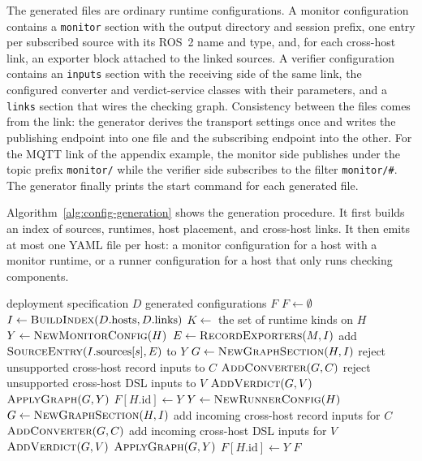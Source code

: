 The generated files are ordinary runtime configurations. A monitor
configuration contains a \texttt{monitor} section with the output directory
and session prefix, one entry per subscribed source with its ROS~2 name and
type, and, for each cross-host link, an exporter block attached to the linked
sources. A verifier configuration contains an \texttt{inputs} section with
the receiving side of the same link, the configured converter and
verdict-service classes with their parameters, and a \texttt{links} section
that wires the checking graph. Consistency between the files comes from the
link: the generator derives the transport settings once and writes the
publishing endpoint into one file and the subscribing endpoint into the
other. For the MQTT link of the appendix example, the monitor side publishes
under the topic prefix \texttt{monitor/} while the verifier side subscribes
to the filter \texttt{monitor/\#}. The generator finally prints the start
command for each generated file.

Algorithm~\ref{alg:config-generation} shows the generation procedure. It
first builds an index of sources, runtimes, host placement, and cross-host
links. It then emits at most one YAML file per host: a monitor configuration
for a host with a monitor runtime, or a runner configuration for a host that
only runs checking components.

\begin{algorithm}[htbp]
\caption{Generate runtime YAML configurations from a deployment specification}
\label{alg:config-generation}
\begin{algorithmic}[1]
\Require deployment specification $D$
\Ensure generated configurations $F$
\State $F \gets \emptyset$
\State $I \gets \Call{BuildIndex}{D.\text{hosts}, D.\text{links}}$
  \State $K \gets$ the set of runtime kinds on $H$
    \State $Y \gets \Call{NewMonitorConfig}{H}$
      \State $E \gets \Call{RecordExporters}{M,I}$
        \State add $\Call{SourceEntry}{I.\text{sources}[s],E}$ to $Y$
      \EndFor
    \EndFor
    \State $G \gets \Call{NewGraphSection}{H,I}$
      \State reject unsupported cross-host record inputs to $C$
      \State $\Call{AddConverter}{G,C}$
    \EndFor
      \State reject unsupported cross-host DSL inputs to $V$
      \State $\Call{AddVerdict}{G,V}$
    \EndFor
    \State $\Call{ApplyGraph}{G,Y}$
    \State $F[H.\text{id}] \gets Y$
    \State $Y \gets \Call{NewRunnerConfig}{H}$
    \State $G \gets \Call{NewGraphSection}{H,I}$
      \State add incoming cross-host record inputs for $C$
      \State $\Call{AddConverter}{G,C}$
    \EndFor
      \State add incoming cross-host DSL inputs for $V$
      \State $\Call{AddVerdict}{G,V}$
    \EndFor
    \State $\Call{ApplyGraph}{G,Y}$
    \State $F[H.\text{id}] \gets Y$
  \EndIf
\EndFor
\State \Return $F$
\end{algorithmic}
\end{algorithm}

